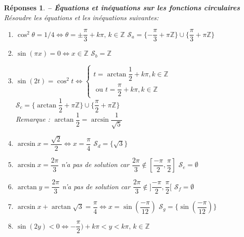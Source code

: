 \documentclass[a4paper,11pt]{article}
\newenvironment{alphate}{\begin{enumerate}[label=\alph*)]}{\end{enumerate}}
\newtheorem{rep}{R\'eponses}
\newenvironment{reponse}{\begin{rep} \em}{\end{rep}}
\begin{document}
\begin{reponse} {\bf -- \'Equations et in\'equations sur les fonctions 
circulaires} \\ 
R\'esoudre les \'equations et les in\'equations suivantes:
\begin{alphate}
\item $\cos^2 \theta = 1/4 \Leftrightarrow
    \theta = \pm \dfrac{\pi}{3} + k\pi, \, k \in \mathbb{Z} $ \hspace{1cm} 
    $\boxed{\mathcal{S}_a = \{-\dfrac{\pi}{3}  + \pi \mathbb{Z} \}\cup\{\dfrac{\pi}{3}  + \pi \mathbb{Z}\}}$ 
\item $\sin(\pi x) = 0 \Leftrightarrow
    x \in \mathbb{Z} $ \hspace{1cm} 
    $\boxed{\mathcal{S}_b = \mathbb{Z} }$ 
\item $\sin(2t) = \cos^2 t \Leftrightarrow
    \left\{\begin{array}{l} t = \arctan\dfrac{1}{2} + k\pi, k \in \mathbb{Z} \\ \text{ ou } t = \dfrac{\pi}{2}  + k\pi, k \in \mathbb{Z} \end{array}\right.$ \hspace{1cm} 
    $\boxed{\mathcal{S}_c = \{ \arctan\dfrac{1}{2}  + \pi \mathbb{Z} \}\cup\{\dfrac{\pi}{2}  + \pi \mathbb{Z}\} }$ \\
    Remarque : $\arctan \dfrac{1}{2} = \arcsin \dfrac{1}{\sqrt{5}}$
\item $\arcsin x =\dfrac{\sqrt{2}}{2} \Leftrightarrow
    x = \dfrac{\pi}{4}  $ \hspace{1cm} 
    $\boxed{\mathcal{S}_d = \{\sqrt{3}\}}$ 
\item $\arcsin x =\dfrac{2\pi}{3}$  n'a pas de solution 
    car $\dfrac{2\pi}{3} \notin [\dfrac{-\pi}{2}, \dfrac{\pi}{2}]$ \hspace{1cm} 
    $\boxed{\mathcal{S}_e =\emptyset }$ 
\item $\arctan y =\dfrac{2\pi}{3}$  n'a pas de solution 
    car $\dfrac{2\pi}{3} \notin ]\dfrac{-\pi}{2}, \dfrac{\pi}{2}[$ \hspace{1cm} 
    $\boxed{\mathcal{S}_f=\emptyset }$ 
\item $\arcsin x + \arctan \sqrt{3} =\dfrac{\pi}{4} \Leftrightarrow
    x = \sin(\dfrac{-\pi}{12}) $ \hspace{1cm} 
    $\boxed{\mathcal{S}_g = \{\sin(\dfrac{-\pi}{12})\} }$ 
\item $\sin(2y) < 0 \Leftrightarrow
    -\dfrac{\pi}{2}) + k\pi < y < k\pi, \, k \in \mathbb{Z} $ \hspace{1cm} 

\end{alphate}
\end{reponse}
\end{document}
